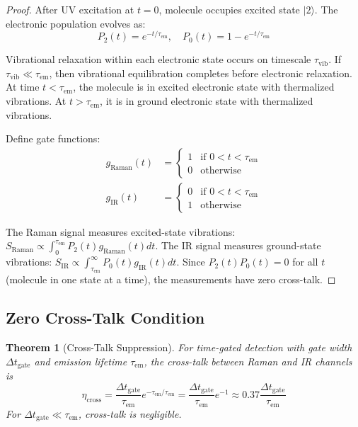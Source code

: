 \documentclass[twocolumn,10pt]{article}
\newtheorem{theorem}{Theorem}[section]
\begin{document}
\begin{proof}
After UV excitation at $t=0$, molecule occupies excited state $|2\rangle$. The electronic population evolves as:
\begin{equation}
P_2(t) = e^{-t/\tau_{\text{em}}}, \quad P_0(t) = 1 - e^{-t/\tau_{\text{em}}}
\end{equation}

Vibrational relaxation within each electronic state occurs on timescale $\tau_{\text{vib}}$. If $\tau_{\text{vib}} \ll \tau_{\text{em}}$, then vibrational equilibration completes before electronic relaxation. At time $t < \tau_{\text{em}}$, the molecule is in excited electronic state with thermalized vibrations. At $t > \tau_{\text{em}}$, it is in ground electronic state with thermalized vibrations.

Define gate functions:
\begin{align}
g_{\text{Raman}}(t) &= \begin{cases} 1 & \text{if } 0 < t < \tau_{\text{em}} \\ 0 & \text{otherwise} \end{cases} \\
g_{\text{IR}}(t) &= \begin{cases} 0 & \text{if } 0 < t < \tau_{\text{em}} \\ 1 & \text{otherwise} \end{cases}
\end{align}

The Raman signal measures excited-state vibrations: $S_{\text{Raman}} \propto \int_0^{\tau_{\text{em}}} P_2(t) g_{\text{Raman}}(t) dt$. The IR signal measures ground-state vibrations: $S_{\text{IR}} \propto \int_{\tau_{\text{em}}}^\infty P_0(t) g_{\text{IR}}(t) dt$. Since $P_2(t) P_0(t) = 0$ for all $t$ (molecule in one state at a time), the measurements have zero cross-talk.
\end{proof}

\subsection{Zero Cross-Talk Condition}

\begin{theorem}[Cross-Talk Suppression]
\label{thm:crosstalk}
For time-gated detection with gate width $\Delta t_{\text{gate}}$ and emission lifetime $\tau_{\text{em}}$, the cross-talk between Raman and IR channels is
\begin{equation}
\eta_{\text{cross}} = \frac{\Delta t_{\text{gate}}}{\tau_{\text{em}}} e^{-\tau_{\text{em}}/\tau_{\text{em}}} = \frac{\Delta t_{\text{gate}}}{\tau_{\text{em}}} e^{-1} \approx 0.37 \frac{\Delta t_{\text{gate}}}{\tau_{\text{em}}}
\end{equation}
For $\Delta t_{\text{gate}} \ll \tau_{\text{em}}$, cross-talk is negligible.
\end{theorem}
\end{document}
